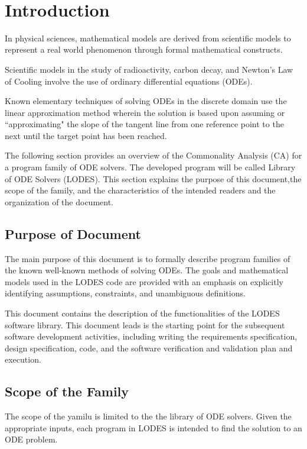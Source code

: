 \documentclass[12pt]{article}
\newcommand{\famname}{LODES} %
\newcommand{\famdesc}{Library of ODE Solvers}
\begin{document}
\newpage

\tableofcontents

~\newpage


\section{Introduction}


In physical sciences, mathematical models are derived from scientific models to
represent a real world phenomenon through formal mathematical constructs.

Scientific models in the study of radioactivity, carbon decay, and Newton's Law of Cooling
involve the use of ordinary differential equations (ODEs).

Known elementary techniques of solving ODEs in the discrete domain use the linear approximation
method wherein the solution is based upon assuming or ``approximating" the slope of the tangent
line from one reference point to the next until the target point has been reached.

The following section provides an overview of the Commonality Analysis (CA) for a program family of ODE solvers. The developed program will be
called \famdesc{} (\famname{}). This section explains the purpose of this
document,the scope of the family, and the characteristics of the intended readers
and the organization of the document.

\subsection{Purpose of Document}
The main purpose of this document is to formally describe program families of
the known well-known methods of solving ODEs. The goals and mathematical models used
in the \famname{} code are provided with
an emphasis on explicitly identifying assumptions, constraints, and unambiguous definitions.

This document contains the description of the functionalities of the \famname{} software
library. This document leads is the starting point for the subsequent software development
activities, including writing the requirements specification, design specification, code, and
the software verification and validation plan and execution.

\subsection{Scope of the Family}
The scope of the yamilu is limited to the the library of ODE solvers. Given
the appropriate inputs, each program in \famname{} is intended to find the solution to an
ODE problem.
\end{document}
